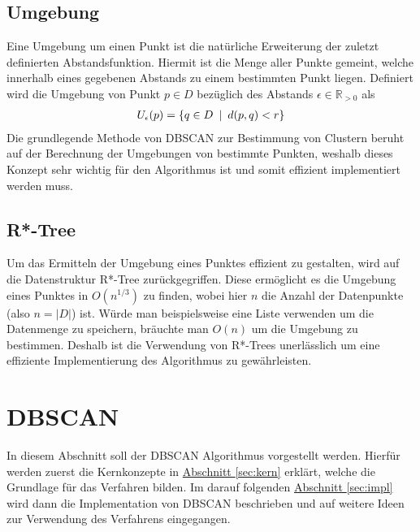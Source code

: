 \documentclass{lni}
\begin{document}
\subsection{Umgebung}
Eine Umgebung um einen Punkt ist die natürliche Erweiterung der zuletzt definierten Abstandsfunktion. Hiermit ist die Menge aller Punkte gemeint, welche innerhalb eines gegebenen Abstands zu einem bestimmten Punkt liegen.
Definiert wird die Umgebung \cite{BALL} von Punkt $p \in D$ bezüglich des Abstands $\epsilon \in \mathbb{R}_{>0}$ als
\begin{align}
    U_{\epsilon}(p) = \{ q \in D \enspace | \enspace d(p,q) < r \} \notag
\end{align}
Die grundlegende Methode von DBSCAN zur Bestimmung von Clustern beruht auf der Berechnung der Umgebungen von bestimmte Punkten, weshalb dieses Konzept sehr wichtig für den Algorithmus ist und somit effizient implementiert werden muss.


\subsection{R*-Tree}
\label{sec:rtree}
Um das Ermitteln der Umgebung eines Punktes effizient zu gestalten, wird auf die Datenstruktur R*-Tree \cite{R*} zurückgegriffen. Diese ermöglicht es die Umgebung eines Punktes in $O(n^{1/3})$ \cite{REV} zu finden, wobei hier $n$ die Anzahl der Datenpunkte (also $n = |D|$) ist. Würde man beispielsweise eine Liste verwenden um die Datenmenge zu speichern, bräuchte man $O(n)$ um die Umgebung zu bestimmen. Deshalb ist die Verwendung von R*-Trees unerlässlich um eine effiziente Implementierung des Algorithmus zu gewährleisten.

%
%

\section{DBSCAN}
\label{sec:dbscan}
In diesem Abschnitt soll der DBSCAN Algorithmus vorgestellt werden.
Hierfür werden zuerst die Kernkonzepte in \hyperref[sec:kern]{Abschnitt \ref{sec:kern}} erklärt, welche die Grundlage für das Verfahren bilden. Im darauf folgenden \hyperref[sec:impl]{Abschnitt \ref{sec:impl}} wird dann die Implementation von DBSCAN beschrieben und auf weitere Ideen zur Verwendung des Verfahrens eingegangen.

%
%
\end{document}
